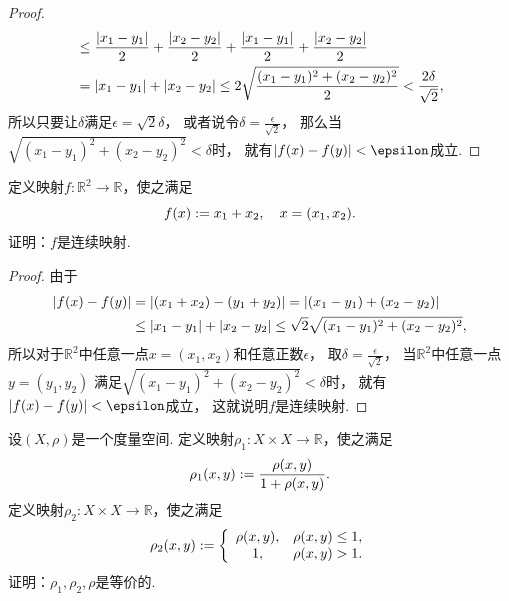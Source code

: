 \begin{example}
\begin{proof}
\begin{align*}
	&\leq \frac{\abs{x_1-y_1}}{2} + \frac{\abs{x_2-y_2}}{2} + \frac{\abs{x_1-y_1}}{2} + \frac{\abs{x_2-y_2}}{2} \\
	&= \abs{x_1-y_1} + \abs{x_2-y_2}
	\leq 2\sqrt{\frac{(x_1-y_1)^2+(x_2-y_2)^2}{2}}
	< \frac{2\delta}{\sqrt2},
\end{align*}
所以只要让\(\delta\)满足\(\epsilon = \sqrt2 \delta\)，
或者说令\(\delta = \frac{\epsilon}{\sqrt2}\)，
那么当\(\sqrt{(x_1-y_1)^2+(x_2-y_2)^2} < \delta\)时，
就有\(\abs{f(x) - f(y)} < \epsilon\)成立.
\end{proof}
\end{example}

\begin{example}
定义映射\(f\colon \mathbb{R}^2 \to \mathbb{R}\)，使之满足\begin{equation*}
	f(x) := x_1 + x_2,
	\quad x=(x_1,x_2).
\end{equation*}
证明：\(f\)是连续映射.
\begin{proof}
由于\begin{align*}
	\abs{f(x) - f(y)}
	&= \abs{
		(x_1 + x_2) - (y_1 + y_2)
	}
	= \abs{(x_1 - y_1) + (x_2 - y_2)} \\
	&\leq \abs{x_1 - y_1} + \abs{x_2 - y_2}
	\leq \sqrt2 \sqrt{(x_1-y_1)^2 + (x_2-y_2)^2},
\end{align*}
所以对于\(\mathbb{R}^2\)中任意一点\(x = (x_1,x_2)\)和任意正数\(\epsilon\)，
取\(\delta = \frac{\epsilon}{\sqrt2}\)，
当\(\mathbb{R}^2\)中任意一点\(y = (y_1,y_2)\)
满足\(\sqrt{(x_1-y_1)^2 + (x_2-y_2)^2} < \delta\)时，
就有\(\abs{f(x) - f(y)} < \epsilon\)成立，
这就说明\(f\)是连续映射.
\end{proof}
\end{example}

\begin{example}
设\((X,\rho)\)是一个度量空间.
定义映射\(\rho_1\colon X \times X \to \mathbb{R}\)，使之满足\begin{equation*}
	\rho_1(x,y) := \frac{\rho(x,y)}{1+\rho(x,y)}.
\end{equation*}
定义映射\(\rho_2\colon X \times X \to \mathbb{R}\)，使之满足\begin{equation*}
	\rho_2(x,y) := \left\{ \begin{array}{cl}
		\rho(x,y), & \rho(x,y) \leq 1, \\
		1, & \rho(x,y) > 1.
	\end{array} \right.
\end{equation*}
证明：\(\rho_1,\rho_2,\rho\)是等价的.
\end{example}
